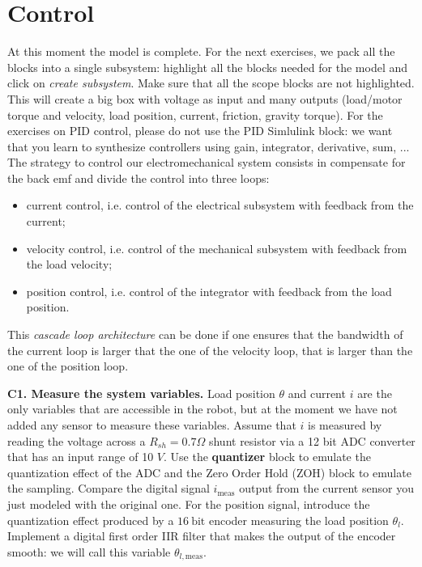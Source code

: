 \documentclass[11pt]{article}
\begin{document}
\par
\section{Control}
\noindent At this moment the model is complete. For the next exercises, 
we pack all the blocks into a single subsystem: highlight all the blocks needed for the model 
and click on \emph{create subsystem}. Make sure that all the scope blocks are not highlighted. 
This will create a big box with voltage as input and many outputs (load/motor torque and velocity, 
load position, current, friction, gravity torque). For the exercises on PID control, please do not use the PID Simlulink block: we want that you learn to synthesize controllers using gain, integrator, derivative, sum, ... 
The strategy to control our electromechanical system consists in compensate for the back emf and divide the control into three loops:
\begin{itemize}
	\item current control, i.e. control of the electrical subsystem with feedback from the current;
	\item velocity control, i.e. control of the mechanical subsystem with feedback from the load velocity;
	\item position control, i.e. control of the integrator with feedback from the load position.
\end{itemize}

This \textit{cascade loop architecture} can be done if one ensures that 
the bandwidth of the current loop is larger that the one of the velocity loop, 
that is larger than the one of the position loop.


\par
\textbf{C1. Measure the system variables.} 
Load position $\theta$ and  current $i$ are the only variables that are accessible in the robot, 
but at the moment we have not added any sensor to  measure these variables. 
Assume that $i$ is measured by reading the voltage across a $R_{sh} = 0.7 \Omega$ shunt resistor 
via a 12 bit ADC converter that has an input range of 10 $V$. Use the \textbf{quantizer}  
block to emulate the quantization effect of the ADC and the Zero Order Hold (ZOH) block to emulate the sampling. 
Compare the digital signal $i_{\mathrm{meas}}$ output from the  
current sensor you just modeled with the original one. 
For the position signal, introduce the quantization effect produced by a $16 \ \mathrm{bit}$ 
encoder measuring the load position $\theta_l$. Implement a digital first order IIR filter that makes 
the output of the encoder smooth: we will call this variable $\theta_{l,\mathrm{meas}}$. 
\end{document}
